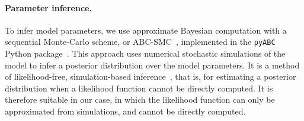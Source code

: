 \documentclass[12pt]{extarticle}
\begin{document}

\paragraph{Parameter inference.} To infer model parameters, we use approximate Bayesian computation with a sequential Monte-Carlo scheme, or ABC-SMC~\citep{Sisson2009}, implemented in the \texttt{pyABC} Python package~\citep[\href{https://pyabc.readthedocs.io}{pyabc.readthedocs.io}]{Klinger2018}.
This approach uses numerical stochastic simulations of the model to infer a posterior distribution over the model parameters. It is a method of likelihood-free, simulation-based inference~\citep{Cranmer2020}, that is, for estimating a posterior distribution when a likelihood function cannot be directly computed. It is therefore suitable in our case, in which the likelihood function can only be approximated from simulations, and cannot be directly computed. 
\end{document}
